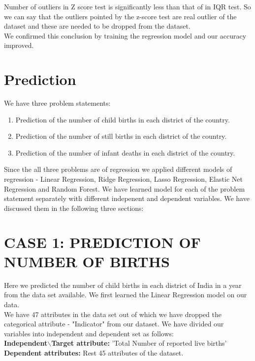 \documentclass[12pt]{article}
\begin{document}
Number of outliers in Z score test is significantly less than that of in IQR test. So we can say that the outliers pointed by the z-score test are real outlier of the dataset and these are needed to be dropped from the dataset. \\
We confirmed this conclusion by training the regression model and our accuracy improved.

\newpage

\section{Prediction}

We have three problem statements:
\begin{enumerate}
	\item Prediction of the number of child births in each district of the country.
	\item Prediction of the number of still births in each district of the country.
	\item Prediction of the number of infant deaths in each district of the country.
\end{enumerate}

Since the all three problems are of regression we applied different models of regression - Linear Regression, Ridge Regression, Lasso Regression, Elastic Net Regression and Random Forest. We have learned model for each of the problem statement separately with different indepenent and dependent variables. We have discussed them in the following three sections:

\section{CASE 1: PREDICTION OF NUMBER OF BIRTHS}

Here we predicted the number of child births in each district of India in a year from the data set available. We first learned the Linear Regression model on our data.\\

We have 47 attributes in the data set out of which we have dropped the categorical attribute - "Indicator" from our dataset. We have divided our variables into independent and dependent set as follows:\\

\textbf{Independent$\backslash$Target attribute:} 'Total Number of reported live births'\\
\textbf{Dependent attributes:} Rest 45 attributes of the dataset.\\
\end{document}
